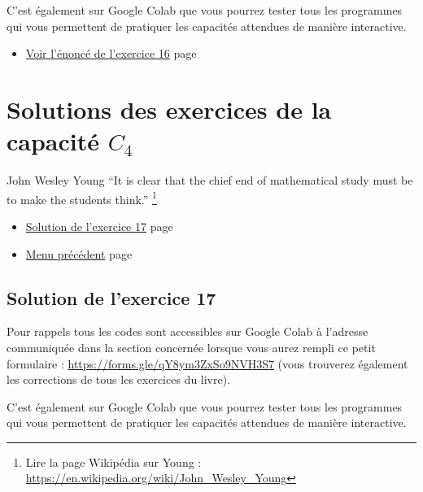 \documentclass[a4paper,11pt]{book}
\begin{document}
C'est également sur Google Colab que vous pourrez tester tous les
programmes qui vous permettent de pratiquer les capacités attendues
de manière interactive.


\begin{itemize}
\item \hyperref[org70c1962]{Voir l'énoncé de l'exercice 16}
page~\pageref{page:sec3.4.2exo16}
\end{itemize}

\clearpage

\chapter{Solutions des exercices de la capacité \(C_4\)}
\label{sec:org9bd0fb3}
\label{orgaa4998d}
\label{page:sec9.4sols-capacity4}

\begin{myquote}{John Wesley Young}
\enquote{It is clear that the chief end of mathematical study must be to
make the students think.}
\footnote{Lire la page Wikipédia sur Young : \url{https://en.wikipedia.org/wiki/John_Wesley_Young}}
\end{myquote}

\clearpage

\label{org8c5c90a}
\label{page:sols-capacity4-menu}
\begin{itemize}
\item \hyperref[orgef40258]{Solution de l'exercice 17}
page~\pageref{page:sec9.4.1sol17}
\item \hyperref[orgcabe6f1]{Menu précédent}
page~\pageref{page:sols-capacities-menu}
\end{itemize}

\clearpage
\section{Solution de l'exercice 17}
\label{sec:orga5f9661}
\label{orgef40258}
\label{page:sec9.4.1sol17}

Pour rappels tous les codes sont accessibles sur Google Colab à
l'adresse communiquée dans la section concernée lorsque vous
aurez rempli ce petit formulaire : \url{https://forms.gle/qY8ym3ZxSo9NVH3S7}
(vous trouverez également les corrections de tous les exercices du
livre).

C'est également sur Google Colab que vous pourrez tester tous les
programmes qui vous permettent de pratiquer les capacités attendues
de manière interactive.
\end{document}
